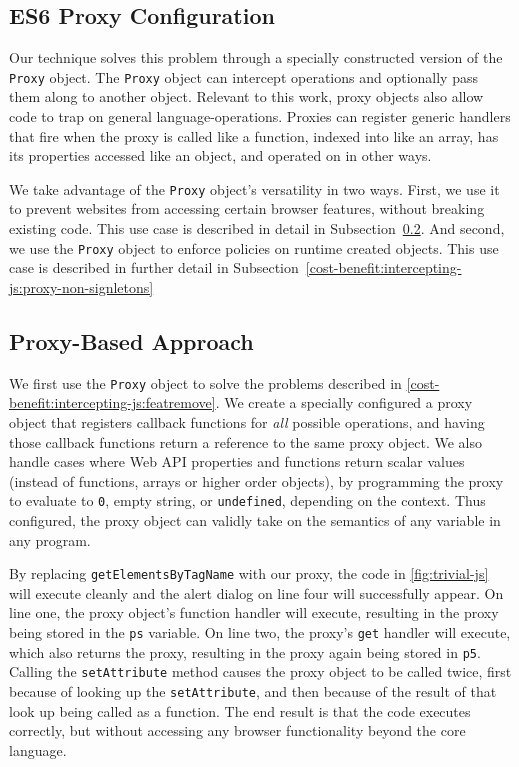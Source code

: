 

\subsection{ES6 Proxy Configuration}

Our technique solves this problem through a specially constructed version of
the \texttt{Proxy} object.  The \texttt{Proxy} object can intercept operations
and optionally pass them along to another object.  Relevant to this work,
proxy objects also allow code to trap on general language-operations.  Proxies
can register generic handlers that fire when the proxy is called like a
function, indexed into like an array, has its properties accessed like an object,
and operated on in other ways.

We take advantage of the \texttt{Proxy} object's versatility in two ways.
First, we use it to prevent websites from accessing certain browser
features, without breaking existing code.  This use case is described in detail
in Subsection~\ref{cost-benefit:intercepting-js:proxy-general}.  And second, we use the \texttt{Proxy}
object to enforce policies on runtime created objects.  This use case is
described in further detail in Subsection~\ref{cost-benefit:intercepting-js:proxy-non-signletons}


\subsection{Proxy-Based Approach}
\label{cost-benefit:intercepting-js:proxy-general}

We first use the \texttt{Proxy} object to solve the problems described in
\ref{cost-benefit:intercepting-js:featremove}.  We create a specially configured a proxy object
that registers callback functions for \textit{all} possible \JS
operations, and having those callback functions return a reference to the
same proxy object.  We also handle cases where Web API properties and
functions return scalar values (instead of functions, arrays or higher order
objects), by programming the proxy to evaluate to \texttt{0}, empty string,
or \texttt{undefined}, depending on the context. Thus configured, the proxy
object can validly take on the semantics of any variable in any \JS program.

By replacing \texttt{getElementsByTagName} with our proxy, the code in
\ref{fig:trivial-js} will execute cleanly and the alert dialog on line
four will successfully appear.  On line one, the proxy object's function handler
will execute, resulting in the proxy being stored in the \texttt{ps} variable.
On line two, the proxy's \texttt{get} handler will execute, which also returns
the proxy, resulting in the proxy again being stored in \texttt{p5}.
Calling the \texttt{setAttribute} method causes the proxy object
to be called twice, first because of looking up the \texttt{setAttribute},
and then because of the result of that look up being called as a function.  The
end result is that the code executes correctly, but without
accessing any browser functionality beyond the core \JS language.

